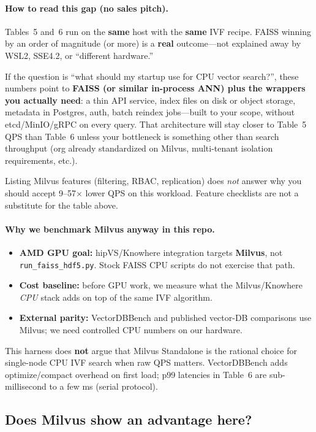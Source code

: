 \documentclass[11pt,a4paper]{article}
\begin{document}
\paragraph{How to read this gap (no sales pitch).}
Tables~5 and~6 run on the \textbf{same} host with the \textbf{same} IVF recipe. FAISS winning
by an order of magnitude (or more) is a \textbf{real} outcome---not explained away by WSL2,
SSE4.2, or ``different hardware.''

If the question is ``what should my startup use for CPU vector search?'', these numbers
point to \textbf{FAISS (or similar in-process ANN) plus the wrappers you actually need}:
a thin API service, index files on disk or object storage, metadata in Postgres, auth,
batch reindex jobs---built to your scope, without etcd/MinIO/gRPC on every query. That
architecture will stay closer to Table~5 QPS than Table~6 unless your bottleneck is
something other than search throughput (org already standardized on Milvus, multi-tenant
isolation requirements, etc.).

Listing Milvus features (filtering, RBAC, replication) does \emph{not} answer why you
should accept 9--57$\times$ lower QPS on this workload. Feature checklists are not a
substitute for the table above.

\paragraph{Why we benchmark Milvus anyway in this repo.}
\begin{itemize}[leftmargin=*]
  \item \textbf{AMD GPU goal:} hipVS/Knowhere integration targets \textbf{Milvus}, not
        \texttt{run\_faiss\_hdf5.py}. Stock FAISS CPU scripts do not exercise that path.
  \item \textbf{Cost baseline:} before GPU work, we measure what the Milvus/Knowhere \emph{CPU}
        stack adds on top of the same IVF algorithm.
  \item \textbf{External parity:} VectorDBBench and published vector-DB comparisons use
        Milvus; we need controlled CPU numbers on our hardware.
\end{itemize}
This harness does \textbf{not} argue that Milvus Standalone is the rational choice for
single-node CPU IVF search when raw QPS matters. VectorDBBench adds optimize/compact overhead
on first load; p99 latencies in Table~6 are sub-millisecond to a few ms (serial protocol).

\subsection{Does Milvus show an advantage here?}
\end{document}
